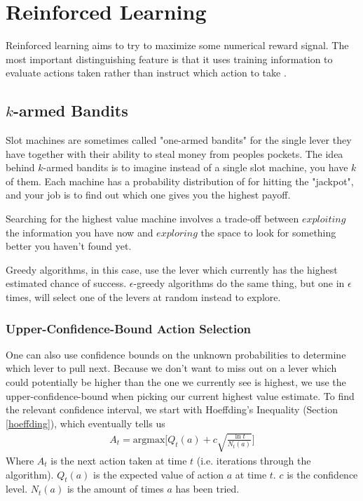 \section{Reinforced Learning}
Reinforced learning aims to try to maximize some numerical reward signal. The most important distinguishing feature is that it uses training information to evaluate actions taken rather than instruct which action to take \cite{sutton}.


\subsection{$k$-armed Bandits}
Slot machines are sometimes called "one-armed bandits" for the single lever they have together with their ability to steal money from peoples pockets. The idea behind $k$-armed bandits is to imagine instead of a single slot machine, you have $k$ of them. Each machine has a probability distribution of for hitting the "jackpot", and your job is to find out which one gives you the highest payoff.

Searching for the highest value machine involves a trade-off between $exploiting$ the information you have now and $exploring$ the space to look for something better you haven't found yet.

Greedy algorithms, in this case, use the lever which currently has the highest estimated chance of success. $\epsilon$-greedy algorithms do the same thing, but one in $\epsilon$ times, will select one of the levers at random instead to explore.


\subsubsection{Upper-Confidence-Bound Action Selection}

One can also use confidence bounds on the unknown probabilities to determine which lever to pull next. Because we don't want to miss out on a lever which could potentially be higher than the one we currently see is highest, we use the upper-confidence-bound when picking our current highest value estimate. To find the relevant confidence interval, we start with Hoeffding's Inequality (Section \ref{hoeffding}), which eventually tells us
\begin{align}
	A_t = \textrm{argmax}\Big[Q_t(a) + c\sqrt{\frac{\ln t}{N_t(a)}}\Big]
\end{align}
Where $A_t$ is the next action taken at time $t$ (i.e. iterations through the algorithm). $Q_t(a)$ is the expected value of action $a$ at time $t$. $c$ is the confidence level. $N_t(a)$ is the amount of times $a$ has been tried.

